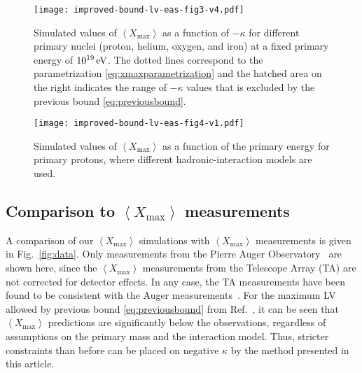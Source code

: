 \documentclass[aps,prd,preprint,longbibliography]{revtex4-1}
\begin{document}
\begin{figure}[p]  %
\centering
\texttt{[image: improved-bound-lv-eas-fig3-v4.pdf]}
\caption{Simulated values of
$\left<X_\text{max}\right>$ as a function of $-\kappa$ for
different primary nuclei (proton, helium, oxygen, and iron)
at a fixed primary energy of $\unit[10^{19}]{eV}$.
The dotted lines correspond to
the parametrization \eqref{eq:xmaxparametrization} and
the hatched area on the right
indicates the range of $-\kappa$ values that is
excluded by the previous bound \eqref{eq:previousbound}.
}
\label{fig:masses}%
\vspace*{5mm}
\centering
\texttt{[image: improved-bound-lv-eas-fig4-v1.pdf]}
\caption{Simulated values of
$\left<X_\text{max}\right>$ as a function of the primary
energy for primary protons, where different hadronic-interaction models
are used.}
\label{fig:models}%
\end{figure}


\subsection{Comparison to $\left<X_\text{max}\right>$ measurements}
\label{subsec:data}

A comparison of our $\left<X_\text{max}\right>$ simulations
with $\left<X_\text{max}\right>$ measurements is given in Fig.~\ref{fig:data}.
Only measurements from the Pierre Auger Observatory~\cite{Auger2014}
are shown here, since the $\left<X_\text{max}\right>$ measurements from
the Telescope Array (TA) are not corrected for detector effects.
In any case,
the TA measurements have been found to be consistent with the Auger
measurements~\cite{Unger2015}. For the maximum LV allowed by previous
bound \eqref{eq:previousbound}
from Ref.~\cite{KlinkhamerSchreck2008},
it can be
seen that $\left<X_\text{max}\right>$ predictions are significantly
below the observations, regardless of assumptions on the primary
mass and the interaction model. Thus, stricter constraints than
before can be placed on negative $\kappa$ by the method presented in this article.
\end{document}
